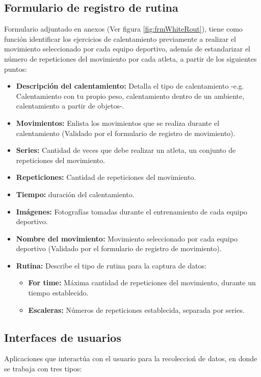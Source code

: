 \subsection{Formulario de registro de rutina} \label{ins:frmRout}
Formulario adjuntado en anexos (Ver figura \ref{fig:frmWhiteRout}), tiene como funci\'on identificar los ejercicios de calentamiento  previamente a realizar el movimiento seleccionado por cada equipo deportivo, adem\'as de estandarizar el n\'umero de repeticiones del movimiento por cada atleta, a partir de los siguientes puntos:
\begin{itemize}
	\item \textbf{Descripci\'on del calentamiento:} Detalla el tipo de calentamiento -e.g. Calentamiento con tu propio peso, calentamiento dentro de un ambiente, calentamiento a partir de objetos-.
	\item \textbf{Movimientos:} Enlista los movimientos que se realiza durante el calentamiento (Validado por el formulario de registro de movimiento).
	\item \textbf{Series:} Cantidad de veces que debe realizar un atleta, un conjunto de repeticiones del movimiento.
	\item \textbf{Repeticiones:} Cantidad de repeticiones del movimiento.
	\item \textbf{Tiempo:} duraci\'on del calentamiento.
	\item \textbf{Im\'agenes:} Fotograf\'ias tomadas durante el entrenamiento de cada equipo deportivo.
	\item \textbf{Nombre del movimiento:} Movimiento seleccionado por cada equipo deportivo  (Validado por el formulario de registro de movimiento).
	\item \textbf{Rutina:} Describe el tipo de rutina para la captura de datos:
	\begin{itemize}
		\item \textbf{For time:} M\'axima cantidad de repeticiones del movimiento, durante un tiempo establecido.
		\item \textbf{Escaleras:} N\'umeros de repeticiones establecida, separada por series.
	\end{itemize}	
\end{itemize}
\subsection{Interfaces de usuarios} \label{ins:UI}
Aplicaciones que interact\'ua con el usuario para la recoleccio\'n de datos, en donde se trabaja con  tres tipos:
